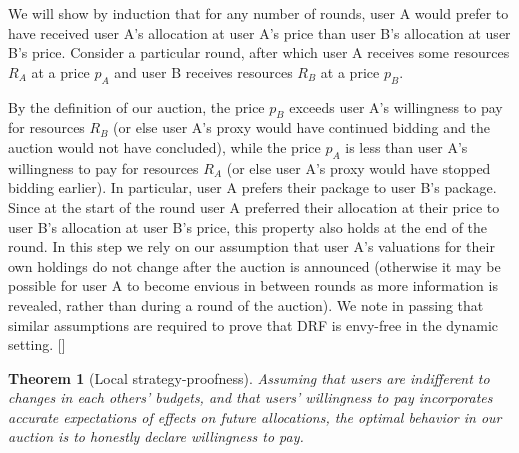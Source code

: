 \documentclass{acm_proc_article-sp}
\newtheorem{theorem}{Theorem}[section]
\newenvironment{pproof}[1][Proof]{\begin{trivlist}
\item[\hskip \labelsep {\bfseries #1}]}{\end{trivlist}}
\begin{document}
\begin{pproof}
We will show by induction that for any number of rounds, user A would prefer to have received user A's allocation at user A's price than user B's allocation at user B's price. Consider a particular round, after which user A receives some resources $R_A$ at a price $p_A$ and user B receives resources $R_B$ at a price $p_B$.

By the definition of our auction, the price $p_B$ exceeds user A's willingness to pay for resources $R_B$ (or else user A's proxy would have continued bidding and the auction would not have concluded), while the price $p_A$ is less than user A's willingness to pay for resources $R_A$ (or else user A's proxy would have stopped bidding earlier). In particular, user A prefers their package to user B's package. Since at the start of the round user A preferred their allocation at their price to user B's allocation at user B's price, this property also holds at the end of the round. In this step we rely on our assumption that user A's valuations for their own holdings do not change after the auction is announced (otherwise it may be possible for user A to become envious in between rounds as more information is revealed, rather than during a round of the auction). We note in passing that similar assumptions are required to prove that DRF is envy-free in the dynamic setting. []
\end{pproof}


\begin{theorem}[Local strategy-proofness] 
Assuming that users are indifferent to changes in each others' budgets,
and that users' willingness to pay 
incorporates accurate expectations of effects on future allocations, 
the optimal behavior in our auction is to honestly declare willingness to pay.
\end{theorem}
\end{document}
